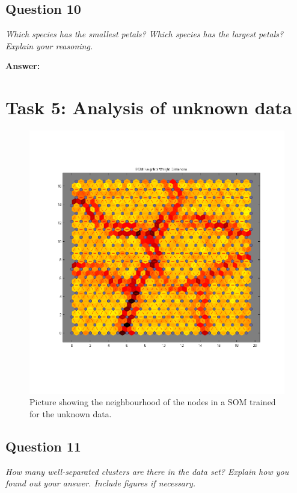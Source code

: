 \documentclass[a4paper]{article}
\begin{document}
\subsection*{Question 10}
\emph{Which species has the smallest petals? Which species has the
largest petals? Explain your reasoning.}

\textbf{Answer:} 

\section*{Task 5: Analysis of unknown data}

 \begin{figure}[H] %
	 \includegraphics[scale=0.6]{20x20trainedUnknown.png}
	 \caption{\label{fig:20x20trainedUnknown} Picture showing the neighbourhood of the nodes in a SOM trained for the unknown data.}
 \end{figure}

\subsection*{Question 11}
\emph{How many well-separated clusters are there in the data set?
Explain how you found out your answer. Include figures if necessary.}
\end{document}
